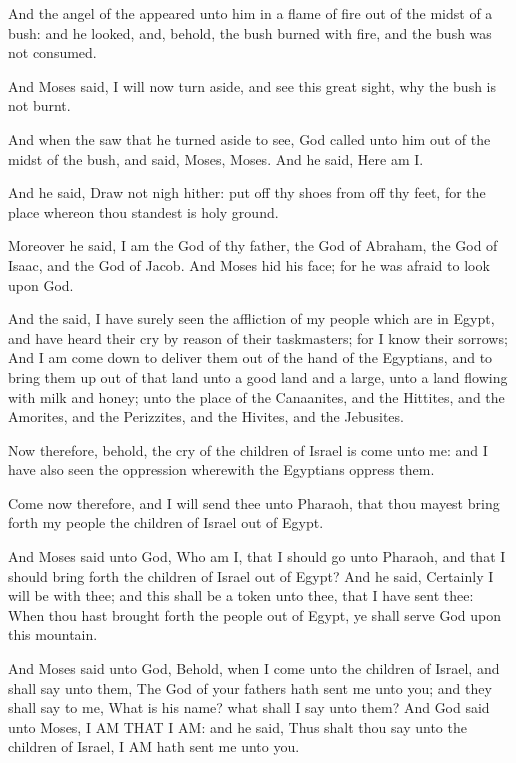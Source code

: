 \verse And the angel of the \LORD appeared unto him in a flame of fire out
of the midst of a bush: and he looked, and, behold, the bush burned
with fire, and the bush was not consumed.

\verse And Moses said, I will now turn aside, and see this great sight,
why the bush is not burnt.

\verse And when the \LORD saw that he turned aside to see, God called unto
him out of the midst of the bush, and said, Moses, Moses. And he said,
Here am I.

\verse And he said, Draw not nigh hither: put off thy shoes from off thy
feet, for the place whereon thou standest is holy ground.

\verse Moreover he said, I am the God of thy father, the God of Abraham,
the God of Isaac, and the God of Jacob. And Moses hid his face; for he
was afraid to look upon God.

\verse And the \LORD said, I have surely seen the affliction of my people
which are in Egypt, and have heard their cry by reason of their
taskmasters; for I know their sorrows; \verse And I am come down to
deliver them out of the hand of the Egyptians, and to bring them up
out of that land unto a good land and a large, unto a land flowing
with milk and honey; unto the place of the Canaanites, and the
Hittites, and the Amorites, and the Perizzites, and the Hivites, and
the Jebusites.

\verse Now therefore, behold, the cry of the children of Israel is come
unto me: and I have also seen the oppression wherewith the Egyptians
oppress them.

\verse Come now therefore, and I will send thee unto Pharaoh, that thou
mayest bring forth my people the children of Israel out of Egypt.

\verse And Moses said unto God, Who am I, that I should go unto Pharaoh,
and that I should bring forth the children of Israel out of Egypt?
\verse And he said, Certainly I will be with thee; and this shall be a
token unto thee, that I have sent thee: When thou hast brought forth
the people out of Egypt, ye shall serve God upon this mountain.

\verse And Moses said unto God, Behold, when I come unto the children of
Israel, and shall say unto them, The God of your fathers hath sent me
unto you; and they shall say to me, What is his name? what shall I say
unto them?  \verse And God said unto Moses, I AM THAT I AM: and he said,
Thus shalt thou say unto the children of Israel, I AM hath sent me
unto you.

